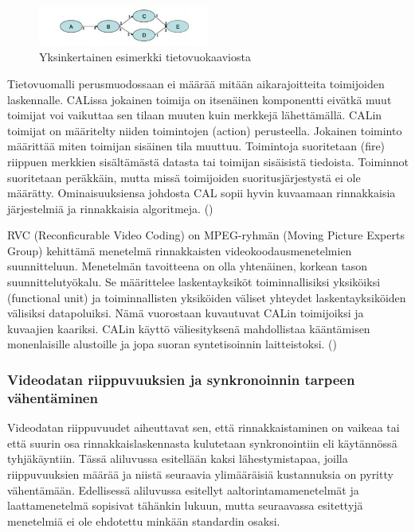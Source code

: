 \begin{figure}[ht]
	\centering
	\includegraphics[width=0.5\textwidth]{dataflow.jpg}
	\caption{Yksinkertainen esimerkki tietovuokaaviosta}
	\label{fig:dataflow}
\end{figure}

Tietovuomalli perusmuodossaan ei määrää mitään aikarajoitteita toimijoiden
laskennalle. CALissa jokainen toimija on itsenäinen komponentti eivätkä muut
toimijat voi vaikuttaa sen tilaan muuten kuin merkkejä lähettämällä. CALin
toimijat on määritelty niiden toimintojen (action) perusteella. Jokainen
toiminto määrittää miten toimijan sisäinen tila muuttuu. Toimintoja
suoritetaan (fire) riippuen merkkien sisältämästä datasta tai toimijan
sisäisistä tiedoista. Toiminnot suoritetaan peräkkäin, mutta missä toimijoiden
suoritusjärjestystä ei ole määrätty. Ominaisuuksiensa johdosta CAL sopii hyvin 
kuvaamaan rinnakkaisia järjestelmiä ja rinnakkaisia algoritmeja. (\citealt{rvc})

RVC (Reconficurable Video Coding) on MPEG-ryhmän (Moving Picture Experts
Group) kehittämä menetelmä rinnakkaisten videokoodausmenetelmien suunnitteluun.
Menetelmän tavoitteena on olla yhtenäinen, korkean tason suunnittelutyökalu.
Se määrittelee laskentayksiköt toiminnallisiksi yksiköiksi (functional unit)
ja toiminnallisten yksiköiden väliset yhteydet laskentayksiköiden välisiksi
datapoluiksi. Nämä vuorostaan kuvautuvat CALin toimijoiksi ja kuvaajien
kaariksi. CALin käyttö väliesityksenä mahdollistaa kääntämisen monenlaisille
alustoille ja jopa suoran syntetisoinnin laitteistoksi. (\citealt{rvc})

\subsubsection{Videodatan riippuvuuksien ja synkronoinnin tarpeen vähentäminen}

Videodatan riippuvuudet aiheuttavat sen, että rinnakkaistaminen on vaikeaa tai
että suurin osa rinnakkaislaskennasta kulutetaan synkronointiin eli käytännössä
tyhjäkäyntiin. Tässä aliluvussa esitellään kaksi lähestymistapaa, joilla
riippuvuuksien määrää ja niistä seuraavia ylimääräisiä kustannuksia on pyritty
vähentämään. Edellisessä aliluvussa esitellyt aaltorintamamenetelmät ja
laattamenetelmä sopisivat tähänkin lukuun, mutta seuraavassa esitettyjä
menetelmiä ei ole ehdotettu minkään standardin osaksi.

